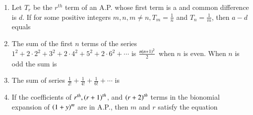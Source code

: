 \documentclass[journal,12pt,twocolumn]{IEEEtran}
\theoremstyle{remark}
\begin{document}
\begin{enumerate}[label={\arabic*.}]
\item {Let $T_r$ be the $r^{th}$ term of an A.P. whose first term is a and common difference is $d$. If for some positive integers $m,n, m\neq n, T_m = \frac{1}{n}$ and $T_n = \frac{1}{m}$, then $a-d$ equals} 
{\hfill{}}
\begin{enumerate}
\end{enumerate}

\item {The sum of the first $n$ terms of the series $1^2+2\cdot2^2+3^2+2\cdot4^2+5^2+2\cdot6^2+\cdots$ is $\frac{n\left(n+1\right)^2}{2}$ when $n$ is even. When $n$ is odd the sum is}
{\hfill{}}
\begin{enumerate}
\end{enumerate}

\item {The sum of series $\frac{1}{2!}+\frac{1}{4!}+\frac{1}{6!}+\cdots$ is}
{\hfill{}} 
\begin{enumerate}
\end{enumerate}

\item {If the coefficients of $r^{th}, \left(r+1\right)^{th}$, and $\left(r+2\right)^{th}$ terms in the bionomial expansion of $\left(1+y\right)^m$ are in A.P., then $m$ and $r$ satisfy the equation}


\end{enumerate}
\end{document}

